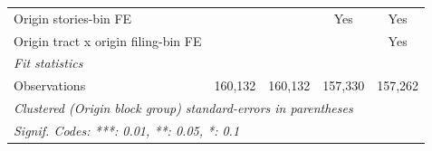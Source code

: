 \begin{tabular}{lcccc}
   Origin stories-bin FE                           &                &                & Yes             & Yes\\  
   Origin tract x origin filing-bin FE             &                &                &                 & Yes\\  
   \midrule
   \emph{Fit statistics}\\
   Observations                                    & 160,132        & 160,132        & 157,330         & 157,262\\  
   \midrule \midrule
   \multicolumn{5}{l}{\emph{Clustered (Origin block group) standard-errors in parentheses}}\\
   \multicolumn{5}{l}{\emph{Signif. Codes: ***: 0.01, **: 0.05, *: 0.1}}\\
\end{tabular}
\par\endgroup
